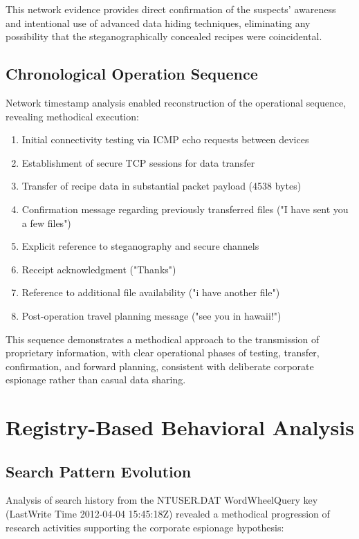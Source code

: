 This network evidence provides direct confirmation of the suspects' awareness and intentional use of advanced data hiding techniques, eliminating any possibility that the steganographically concealed recipes were coincidental.

\subsection{Chronological Operation Sequence}
Network timestamp analysis enabled reconstruction of the operational sequence, revealing methodical execution:

\begin{enumerate}
    \item Initial connectivity testing via ICMP echo requests between devices
    \item Establishment of secure TCP sessions for data transfer
    \item Transfer of recipe data in substantial packet payload (4538 bytes)
    \item Confirmation message regarding previously transferred files ("I have sent you a few files")
    \item Explicit reference to steganography and secure channels
    \item Receipt acknowledgment ("Thanks")
    \item Reference to additional file availability ("i have another file")
    \item Post-operation travel planning message ("see you in hawaii!")
\end{enumerate}

This sequence demonstrates a methodical approach to the transmission of proprietary information, with clear operational phases of testing, transfer, confirmation, and forward planning, consistent with deliberate corporate espionage rather than casual data sharing.

\section{Registry-Based Behavioral Analysis}
\subsection{Search Pattern Evolution}
Analysis of search history from the NTUSER.DAT WordWheelQuery key (LastWrite Time 2012-04-04 15:45:18Z) revealed a methodical progression of research activities supporting the corporate espionage hypothesis:

